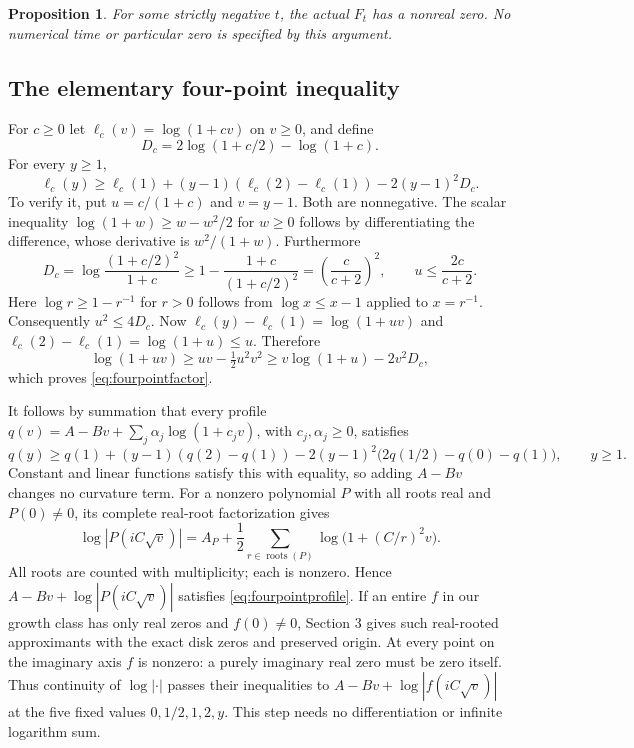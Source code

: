 \documentclass[11pt]{article}
\newtheorem{proposition}[theorem]{Proposition}
\begin{document}
\begin{proposition}\label{prop:quadraticnegative}
For some strictly negative $t$, the actual $F_t$ has a nonreal zero.
No numerical time or particular zero is specified by this argument.
\end{proposition}
\subsection*{The elementary four-point inequality}
For $c\geq0$ let $\ell_c(v)=\log(1+cv)$ on $v\geq0$, and define
\[
 D_c=2\log(1+c/2)-\log(1+c).
\]
For every $y\geq1$,
\begin{equation}\label{eq:fourpointfactor}
 \ell_c(y)\geq \ell_c(1)+(y-1)(\ell_c(2)-\ell_c(1))
                         -2(y-1)^2D_c.
\end{equation}
To verify it, put $u=c/(1+c)$ and $v=y-1$. Both are nonnegative.
The scalar inequality $\log(1+w)\geq w-w^2/2$ for $w\geq0$ follows
by differentiating the difference, whose derivative is $w^2/(1+w)$.
Furthermore
\[
 D_c=\log\frac{(1+c/2)^2}{1+c}
 \geq1-\frac{1+c}{(1+c/2)^2}
 =\left(\frac c{c+2}\right)^2,
 \qquad u\leq\frac{2c}{c+2}.
\]
Here $\log r\geq1-r^{-1}$ for $r>0$ follows from
$\log x\leq x-1$ applied to $x=r^{-1}$. Consequently $u^2\leq4D_c$.
Now $\ell_c(y)-\ell_c(1)=\log(1+uv)$ and
$\ell_c(2)-\ell_c(1)=\log(1+u)\leq u$. Therefore
\[
 \log(1+uv)\geq uv-\tfrac12u^2v^2
                 \geq v\log(1+u)-2v^2D_c,
\]
which proves \eqref{eq:fourpointfactor}.

It follows by summation that every profile
$q(v)=A-Bv+\sum_j\alpha_j\log(1+c_jv)$, with $c_j,\alpha_j\geq0$,
satisfies
\begin{equation}\label{eq:fourpointprofile}
 q(y)\geq q(1)+(y-1)(q(2)-q(1))
       -2(y-1)^2\bigl(2q(1/2)-q(0)-q(1)\bigr),\qquad y\geq1.
\end{equation}
Constant and linear functions satisfy this with equality, so adding
$A-Bv$ changes no curvature term. For a nonzero polynomial $P$ with
all roots real and $P(0)\ne0$, its complete real-root factorization gives
\[
 \log|P(iC\sqrt v)|
 =A_P+\frac12\sum_{r\in\operatorname{roots}(P)}
                    \log\bigl(1+(C/r)^2v\bigr).
\]
All roots are counted with multiplicity; each is nonzero. Hence
$A-Bv+\log|P(iC\sqrt v)|$ satisfies \eqref{eq:fourpointprofile}.
If an entire $f$ in our growth class has only real zeros and $f(0)\ne0$,
Section 3 gives such real-rooted approximants with the exact disk
zeros and preserved origin. At every point on the imaginary axis
$f$ is nonzero: a purely imaginary real zero must be zero itself.
Thus continuity of $\log|\cdot|$ passes their inequalities to
$A-Bv+\log|f(iC\sqrt v)|$ at the five fixed values
$0,1/2,1,2,y$. This step needs no differentiation or infinite logarithm sum.
\end{document}
